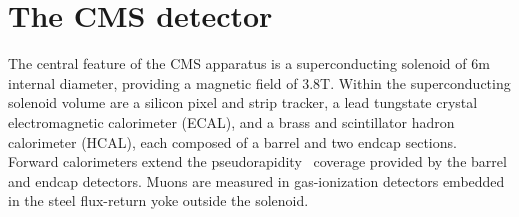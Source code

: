 \section{The CMS detector}
\label{sec:detector}


The central feature of the CMS apparatus is a superconducting solenoid
of 6\unit{m} internal diameter, providing a magnetic field of
3.8\unit{T}. Within the superconducting solenoid volume are a silicon
pixel and strip tracker, a lead tungstate crystal electromagnetic
calorimeter (ECAL), and a brass and scintillator hadron calorimeter
(HCAL), each composed of a barrel and two endcap sections. Forward
calorimeters extend the pseudorapidity~\cite{Chatrchyan:2008zzk}
coverage provided by the barrel and endcap detectors. Muons are measured
in gas-ionization detectors embedded in the steel flux-return yoke
outside the solenoid.

